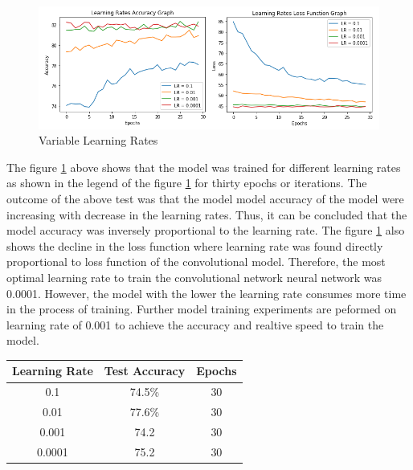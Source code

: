 \begin{figure}[!htp]
    \centering
    \includegraphics[width=15cm]{Images/lr.png}
    \caption{Variable Learning Rates}
    \label{fig:lrates}
\end{figure}

The figure \ref{fig:lrates} above shows that the model was trained for different learning rates as shown
in the legend of the figure \ref{fig:lrates} for thirty epochs or iterations. The outcome of the above test 
was that the model model accuracy of the model were increasing with decrease in the learning rates. Thus, it 
can be concluded that the model accuracy was  inversely proportional to the learning rate. The figure \ref{fig:lrates} also shows the 
decline in the loss function where learning rate was found directly proportional to loss function of the 
convolutional model. Therefore, the most optimal learning rate to train the convolutional network 
neural network was 0.0001. However, the model with the lower the learning rate consumes more time in the 
process of training. Further model training experiments are peformed on 
learning rate of 0.001 to achieve the accuracy and realtive speed to train the model.
\pagebreak

\begin{center}
    \begin{tabular} {| c | c | c |}
        \hline
        Learning Rate & Test Accuracy & Epochs \\ 
        \hline
        0.1 & 74.5\% & 30 \\ 
        \hline 
        0.01 & 77.6\% & 30  \\
        \hline 
        0.001 & 74.2 & 30  \\
        \hline
        0.0001 & 75.2 & 30  \\
        \hline
    \end{tabular}
\end{center}

